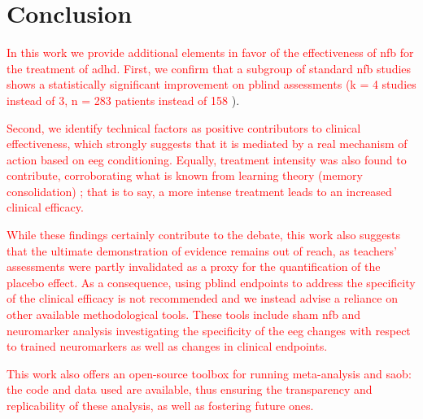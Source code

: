 

\section{Conclusion}

\textcolor{red}{In this work we provide additional elements in favor of the effectiveness of \gls{nfb} for the treatment of \gls{adhd}. First, 
we confirm that a subgroup of standard \gls{nfb} studies shows a statistically significant improvement on \gls{pblind} 
assessments (k = 4 studies instead of 3, n = 283 patients instead of 158} \citet{Cortese2016}). 

\textcolor{red}{Second, we identify technical factors as positive contributors to clinical effectiveness, which strongly suggests 
that it is mediated by a real mechanism of action based on \gls{eeg} conditioning. Equally, treatment intensity was also found to 
contribute, corroborating what is known from learning theory (memory consolidation)} \citep{Mowrer1960}\textcolor{red}{; that is to say, a more intense treatment leads to 
an increased clinical efficacy.}

\textcolor{red}{While these findings certainly contribute to the debate, this work also suggests that the ultimate demonstration of evidence 
remains out of reach, as teachers’ assessments were partly invalidated as a proxy for the quantification of the placebo effect. 
As a consequence, using \gls{pblind} endpoints to address the specificity of the clinical efficacy is not recommended 
and we instead advise a reliance on other available methodological tools. These tools include sham \gls{nfb} and neuromarker 
analysis investigating the specificity of the \gls{eeg} changes with respect to trained neuromarkers as well as changes 
in clinical endpoints.}

\textcolor{red}{This work also offers an open-source toolbox for running meta-analysis and \gls{saob}: the code and data used are available, 
thus ensuring the transparency and replicability of these analysis, as well as fostering future ones.}

